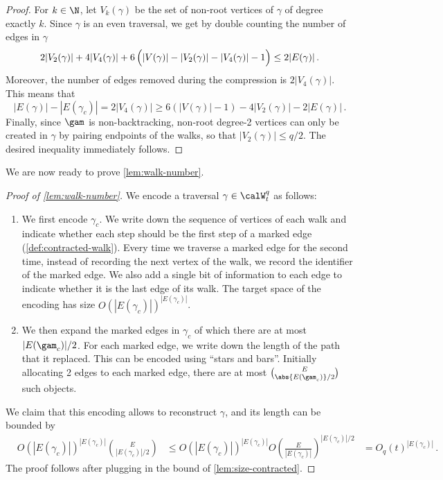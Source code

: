 \documentclass[12pt]{article}
\begin{document}
\begin{proof}
    For $k\in\N$, let $V_k(\gamma)$ be the set of non-root vertices of $\gamma$ of degree exactly $k$. Since $\gamma$ is an even traversal, we get by double counting the number of edges in $\gamma$
    \[
        2|V_2(\gamma)|+4 |V_4(\gamma)| + 6\left(|V(\gamma)|-|V_2(\gamma)|-|V_4(\gamma)|-1\vphantom{\sum}\right)\le 2|E(\gamma)|\,.
    \]
    Moreover, the number of edges removed during the compression is $2|V_4(\gamma)|$. This means that
    \[
        |E(\gamma)|-|E(\gamma_c)| = 2|V_4(\gamma)|\ge  6(|V(\gamma)|-1)-4|V_2(\gamma)|-2|E(\gamma)|\,.
    \]
    Finally, since $\gam$ is non-backtracking, non-root degree-2 vertices can only be created in $\gamma$ by pairing endpoints of the walks, so that $|V_2(\gamma)|\le q/2$. The desired inequality immediately follows.
\end{proof}

We are now ready to prove \cref{lem:walk-number}.

\begin{proof}[Proof of \cref{lem:walk-number}]
    We encode a traversal $\gamma\in\calW_t^q$ as follows:
    \begin{enumerate}
        \item We first encode $\gamma_c$. 
        We write down the sequence of vertices of each walk and indicate whether each step should be the first step of a marked edge (\cref{def:contracted-walk}). 
        Every time we traverse a marked edge for the second time, instead of recording the next vertex of the walk, we record the identifier of the marked edge. We also add a single bit of information to each edge to indicate whether it is the last edge of its walk. The target space of the encoding has size $O(|E(\gamma_c)|)^{|E(\gamma_c)|}$. 
        
        \item We then expand the marked edges in $\gamma_c$ of which there are at most $|E(\gam_c)|/2$. For each marked edge, we write down the length of the path that it replaced. This can be encoded using ``stars and bars''. Initially allocating 2 edges to each marked edge, there are at most $\binom{E}{\abs{E(\gam_c)}/2}$ such objects.
    \end{enumerate}
    We claim that this encoding allows to reconstruct $\gamma$, and its length can be bounded by
    \begin{align*}
        &O(|E(\gamma_c)|)^{|E(\gamma_c)|} \binom{E}{|E(\gamma_c)|/2}
        &\le O(|E(\gamma_c)|)^{|E(\gamma_c)|} O\left(\frac{E}{|E(\gamma_c)|}\right)^{|E(\gamma_c)|/2}
        &=O_q(t)^{|E(\gamma_c)|}\,.
    \end{align*}
The proof follows after plugging in the bound of \cref{lem:size-contracted}.
\end{proof}
 
\end{document}
